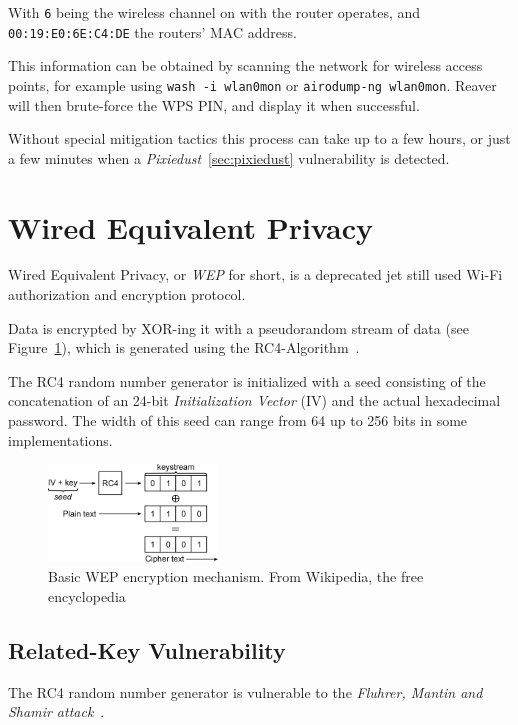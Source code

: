 With \lstinline{6} being the wireless channel on with the router operates, and \lstinline{00:19:E0:6E:C4:DE} the routers' MAC address. 

This information can be obtained by scanning the network for wireless access points, for example using \lstinline{wash -i wlan0mon} or \lstinline{airodump-ng wlan0mon}. Reaver will then brute-force the WPS PIN, and display it when successful. 

Without special mitigation tactics this process can take up to a few hours, or just a few minutes when a \emph{Pixiedust}~\ref{sec:pixiedust} vulnerability is detected.

\section{Wired Equivalent Privacy}

Wired Equivalent Privacy, or \emph{WEP} for short, is a deprecated jet still used Wi-Fi authorization and encryption protocol.

Data is encrypted by XOR-ing it with a pseudorandom stream of data (see Figure~\ref{fig:wepmech}), which is generated using the RC4-Algorithm~\cite{WiFi16}.

The RC4 random number generator is initialized with a seed consisting of the concatenation of an 24-bit \emph{Initialization Vector} (IV) and the actual hexadecimal password. The width of this seed can range from 64 up to 256 bits in some implementations.

\begin{figure}
\includegraphics[width=0.4\textwidth]{src/img/Wep-crypt-alt.png}
\caption{Basic WEP encryption mechanism. From Wikipedia, the free encyclopedia~\cite{BHL07}}\label{fig:wepmech}
\end{figure}

\subsection{Related-Key Vulnerability}

The RC4 random number generator is vulnerable to the \emph{Fluhrer, Mantin and Shamir attack}~\cite{FMS01}.

